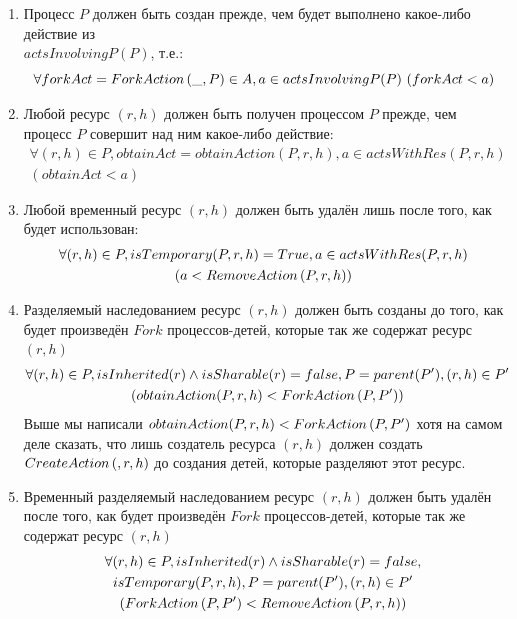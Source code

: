 \begin{enumerate}
	\item \label{chap2:preced:a} Процесс $P$ должен быть создан прежде, чем будет выполнено какое-либо действие из\\
	$actsInvolvingP(P)$, т.е.:
		\begin{equation*}
		     \forall forkAct = ForkAction\left( \_, P \right) \in A, a \in actsInvolvingP(P)\ (forkAct < a) 
		\end{equation*}

	\item \label{chap2:preced:b} Любой ресурс $(r, h)$ должен быть получен процессом $P$ прежде, чем процесс $P$ совершит над ним какое-либо действие:
		\begin{gather*}
			\forall (r, h) \in P, obtainAct = obtainAction(P, r, h), a \in actsWithRes(P, r, h)\\
			(obtainAct < a)
		\end{gather*}

	\item \label{chap2:preced:c} Любой временный ресурс $(r, h)$ должен быть удалён лишь после того, как будет использован:
		\begin{gather*}
			\forall (r, h) \in P, isTemporary(P, r, h) = True, a \in actsWithRes(P, r, h)\\ 
			(a < RemoveAction\left( P, r, h \right))
		\end{gather*}

	\item \label{chap2:preced:d} Разделяемый наследованием ресурс $(r, h)$ должен быть созданы до того, как будет произведён $Fork$ процессов-детей, которые так же содержат ресурс $(r, h)$
		\begin{gather*}
			\forall (r, h) \in P, isInherited(r) \land isSharable(r) = false, P = parent(P'), (r, h) \in P'\\
			(obtainAction(P, r, h) < ForkAction\left( P, P' \right))
		\end{gather*}
		Выше мы написали $obtainAction(P, r, h) < ForkAction\left( P, P' \right)$ хотя на самом деле сказать, что лишь создатель ресурса $(r, h)$ должен создать $CreateAction\left( , r, h \right)$ до создания детей, которые разделяют этот ресурс. 

	\item \label{chap2:preced:e} Временный разделяемый наследованием ресурс $(r, h)$ должен быть удалён после того, как будет произведён $Fork$ процессов-детей, которые так же содержат ресурс $(r, h)$
		\begin{gather*}
			\forall (r, h) \in P, isInherited(r) \land isSharable(r) = false, \\
			isTemporary(P, r, h), P = parent(P'), (r, h) \in P'\\
			(ForkAction\left( P, P' \right) < RemoveAction\left( P, r, h \right))
		\end{gather*}


\end{enumerate}
